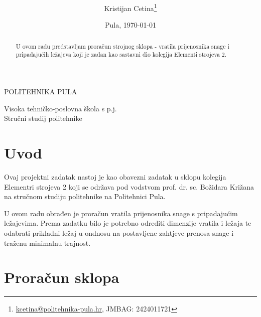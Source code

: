 \documentclass[12pt,a4paper]{article}
\author{Kristijan Cetina\footnote{\href{mailto:kcetina@politehnika-pula.hr?subject=\mailFriendlynaslovRada}{kcetina@politehnika-pula.hr}, JMBAG: 2424011721}}
\title{\kolegij \\ \naslovRada}
\date{Pula, \today}
\begin{document}
\begin{titlepage}
\clearpage
\begin{center}
\begin{Huge}
POLITEHNIKA PULA\\
\end{Huge}
\begin{LARGE}
Visoka tehničko-poslovna škola s p.j.\\
Stručni studij politehnike\\
\end{LARGE}
\end{center}
\vspace{3cm}
{\let\newpage\relax\maketitle}
\thispagestyle{empty}
\vfill
\begin{abstract}
U ovom radu predstavljam proračun strojnog sklopa - vratila prijenosnika snage i pripadajućih ležajeva koji je zadan kao sastavni dio kolegija Elementi strojeva 2.
\end{abstract}
\end{titlepage}

\tableofcontents
\newpage
\section{Uvod}
Ovaj projektni zadatak nastoj je kao obavezni zadatak u sklopu kolegija Elementri strojeva 2 koji se održava pod vodstvom prof. dr. sc. Božidara Križana na stručnom studiju politehnike na Politehnici Pula.

U ovom radu obrađen je proračun vratila prijenosnika snage s pripadajućim ležajevima. Prema zadatku bilo je potrebno odrediti dimenzije vratila i ležaja te odabrati prikladni ležaj u ondnosu na postavljene zahtjeve prenosa snage i traženu minimalnu trajnost.

\section{Proračun sklopa}
\end{document}
